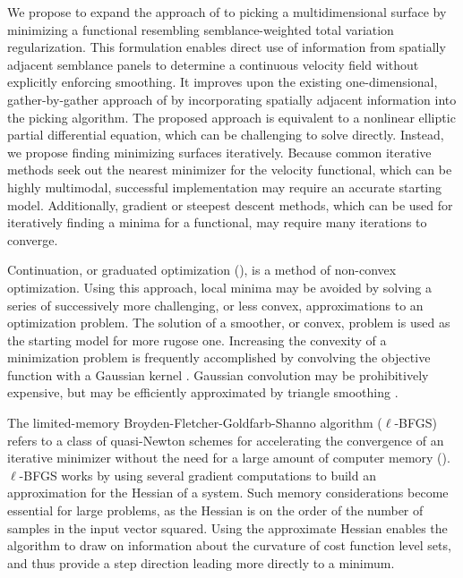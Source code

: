 We propose to expand the approach of  \cite{fomelvelanal} to picking a multidimensional surface by minimizing a functional resembling semblance-weighted total variation regularization.  This formulation enables  direct use of information from spatially adjacent semblance panels to determine a continuous velocity field without explicitly enforcing smoothing.  It improves upon the existing one-dimensional, gather-by-gather approach of \cite{fomelvelanal} by incorporating spatially adjacent information into the picking algorithm.  The proposed approach is equivalent to a nonlinear elliptic partial differential equation, which can be challenging to solve directly.  Instead, we propose finding minimizing surfaces iteratively. Because common iterative  methods seek out the nearest minimizer for the velocity functional, which can be highly multimodal, successful implementation may require an accurate starting model.  Additionally, gradient or steepest descent methods, which can be used for iteratively finding a minima for a functional, may require many iterations to converge.


Continuation, or graduated optimization (\citealp{Blake87visualreconstruction,chapelle-2006,chaudhuri-2011,hossein-2015,pmlr-v48-hazanb16,xue-2016}), is  a method of non-convex optimization. Using this approach, local minima may be avoided by solving a series of successively more challenging, or less convex, approximations to an optimization problem.  The solution of a 
smoother, or   convex, problem is used as the starting model for more rugose one.  Increasing the convexity of a minimization problem is frequently accomplished by convolving the objective function with a Gaussian kernel \cite[]{wu-1996}. Gaussian convolution may be prohibitively expensive, but may be efficiently approximated by triangle smoothing \cite[]{claerbout1993earth}.  

The limited-memory Broyden-Fletcher-Goldfarb-Shanno algorithm ($\ell$-BFGS) refers to a class of quasi-Newton schemes for accelerating the convergence of an iterative minimizer without the need for a large amount of computer memory (\citealp{nocedal-1980,liu-1989,li-2001}).  $\ell$-BFGS works by using several gradient computations to build an approximation for the Hessian of a system.  Such memory considerations become essential for large problems, as the Hessian is on the order of the number of samples in the input vector squared.  Using the approximate Hessian enables the algorithm to draw on information about the curvature of cost function level sets, and thus provide a step direction leading more directly to a minimum.

